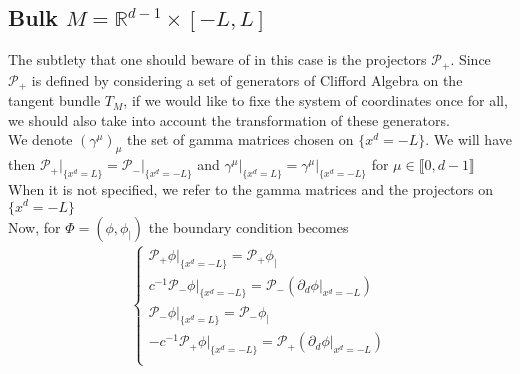 \subsection{Bulk $M = \mathbb{R}^{d-1} \times [-L, L]$ }
The subtlety that one should beware of in this case is the projectors $\mathcal{P}_+$.
Since $\mathcal{P}_+$ is defined by considering a set of generators of Clifford Algebra on the tangent bundle $T_{ M}$, 
if we would like to fixe the system of coordinates once for all,
we should also take into account the transformation of these generators. \\
We denote $(\gamma^\mu)_\mu$ the set of gamma matrices chosen on $\{x^d  = - L \}$. 
We will have then $\mathcal{P}_+\vert_{\{x^d = L\}} = \mathcal{P}_-\vert_{\{x^d = -L\}}$ and $\gamma^\mu\vert_{\{x^d = L\}}=\gamma^\mu\vert_{\{x^d = -L\}}$ for $\mu\in\llbracket 0, d-1 \rrbracket$
When it is not specified, we refer to the gamma matrices and the projectors on $\{x^d = -L\}$ \\
Now, for $\Phi = (\phi, \phi_|)$ the boundary condition becomes
\begin{equation*}
\begin{split}
\begin{cases}
\mathcal{P}_+ \phi\vert_{\{x^d = -L\}} = \mathcal{P}_+\phi_| \\
c^{-1}\mathcal{P}_-\phi\vert_{\{x^d = -L\}} = \mathcal{P}_-(\partial_d \phi\vert_{x^d = -L}) \\
\mathcal{P}_- \phi\vert_{\{x^d = L\}} = \mathcal{P}_-\phi_| \\
-c^{-1}\mathcal{P}_+\phi\vert_{\{x^d = -L\}} = \mathcal{P}_+(\partial_d \phi\vert_{x^d = -L}) \\
\end{cases}
\end{split}
\end{equation*}
